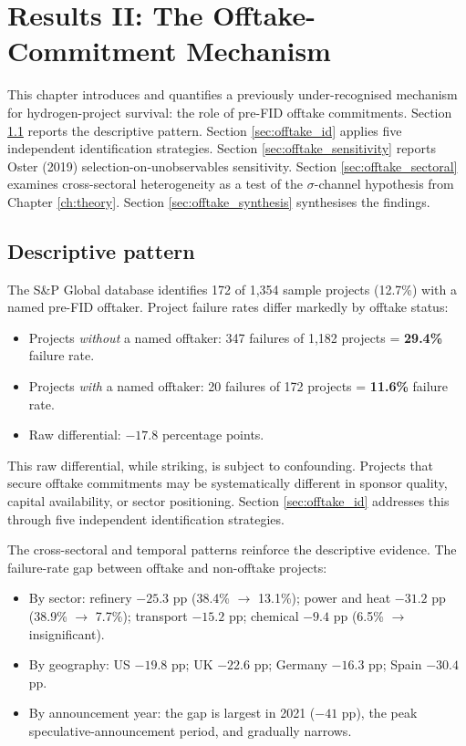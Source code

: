 \chapter{Results II: The Offtake-Commitment Mechanism}
\label{ch:results_offtake}

This chapter introduces and quantifies a previously under-recognised mechanism for hydrogen-project survival: the role of pre-FID offtake commitments. Section \ref{sec:offtake_descriptive} reports the descriptive pattern. Section \ref{sec:offtake_id} applies five independent identification strategies. Section \ref{sec:offtake_sensitivity} reports Oster (2019) selection-on-unobservables sensitivity. Section \ref{sec:offtake_sectoral} examines cross-sectoral heterogeneity as a test of the $\sigma$-channel hypothesis from Chapter \ref{ch:theory}. Section \ref{sec:offtake_synthesis} synthesises the findings.

\section{Descriptive pattern}
\label{sec:offtake_descriptive}

The S\&P Global database identifies 172 of 1,354 sample projects (12.7\%) with a named pre-FID offtaker. Project failure rates differ markedly by offtake status:

\begin{itemize}[leftmargin=2em]
\item Projects \emph{without} a named offtaker: 347 failures of 1,182 projects = \textbf{29.4\%} failure rate.
\item Projects \emph{with} a named offtaker: 20 failures of 172 projects = \textbf{11.6\%} failure rate.
\item Raw differential: $-17.8$ percentage points.
\end{itemize}

This raw differential, while striking, is subject to confounding. Projects that secure offtake commitments may be systematically different in sponsor quality, capital availability, or sector positioning. Section \ref{sec:offtake_id} addresses this through five independent identification strategies.

The cross-sectoral and temporal patterns reinforce the descriptive evidence. The failure-rate gap between offtake and non-offtake projects:
\begin{itemize}[leftmargin=2em]
\item By sector: refinery $-25.3$ pp (38.4\% $\to$ 13.1\%); power and heat $-31.2$ pp (38.9\% $\to$ 7.7\%); transport $-15.2$ pp; chemical $-9.4$ pp (6.5\% $\to$ insignificant).
\item By geography: US $-19.8$ pp; UK $-22.6$ pp; Germany $-16.3$ pp; Spain $-30.4$ pp.
\item By announcement year: the gap is largest in 2021 ($-41$ pp), the peak speculative-announcement period, and gradually narrows.
\end{itemize}

